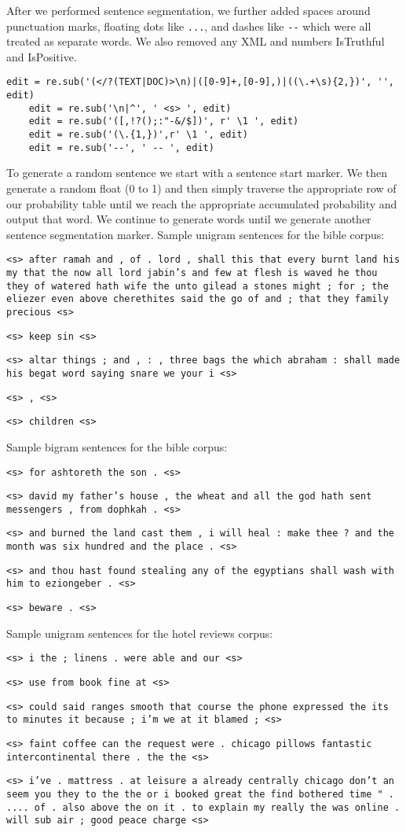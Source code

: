 \documentclass{article}
\begin{document}
After we performed sentence segmentation, we further added spaces around punctuation marks, floating dots like \texttt{...}, and dashes like \texttt{-{}-} which were all treated as separate words. We also removed any XML and numbers IsTruthful and IsPositive.

{\small
\begin{verbatim}
edit = re.sub('(</?(TEXT|DOC)>\n)|([0-9]+,[0-9],)|((\.+\s){2,})', '', edit)
    edit = re.sub('\n|^', ' <s> ', edit)
    edit = re.sub('([,!?();:"-&/$])', r' \1 ', edit)
    edit = re.sub('(\.{1,})',r' \1 ', edit)
    edit = re.sub('--', ' -- ', edit)
\end{verbatim}
}

\newpage

\par To generate a random sentence we start with a sentence start marker. We then generate a random float (0 to 1)
and then simply traverse the appropriate row of our probability table until we reach the appropriate accumulated probability and output that word.
We continue to generate words until we generate another sentence segmentation marker.
\vspace{2mm}
\setlength{\parindent}{0cm}
\newcommand\npar{\par\smallskip}
Sample unigram sentences for the bible corpus:\npar
\texttt{<s> after ramah and , of . lord , shall this that every burnt land his my that the now all lord jabin's and few at flesh is waved he thou they of watered hath wife the unto gilead a stones might ; for ; the eliezer even above cherethites said the go of and ; that they family precious <s>}\npar
\texttt{<s> keep sin <s>}\npar
\texttt{<s> altar things ; and , : , three bags the which abraham : shall made his begat word saying snare we your i <s>}\npar
\texttt{<s> , <s>}\npar
\texttt{<s> children <s>}\npar
\bigskip

Sample bigram sentences for the bible corpus:\npar
\texttt{<s> for ashtoreth the son . <s>}\npar
\texttt{<s> david my father's house , the wheat and all the god hath sent messengers , from dophkah . <s>}\npar
\texttt{<s> and burned the land cast them , i will heal : make thee ? and the month was six hundred and the place . <s>}\npar
\texttt{<s> and thou hast found stealing any of the egyptians shall wash with him to eziongeber . <s>}\npar
\texttt{<s> beware . <s>}\npar
\bigskip

Sample unigram sentences for the hotel reviews corpus:\npar
\texttt{<s> i the ; linens . were able and our <s>}\npar
\texttt{<s> use from book fine at <s>}\npar
\texttt{<s> could said ranges smooth that course the phone expressed the its to minutes it because ; i'm we at it blamed ; <s>}\npar
\texttt{<s> faint coffee can the request were . chicago pillows fantastic intercontinental there . the the <s>}\npar
\texttt{<s> i've . mattress . at leisure a already centrally chicago don't an seem you they to the the or i booked great the find bothered time " . .... of . also above the on it . to explain my really the was online . will sub air ; good peace charge <s>}\npar
\bigskip
\end{document}
